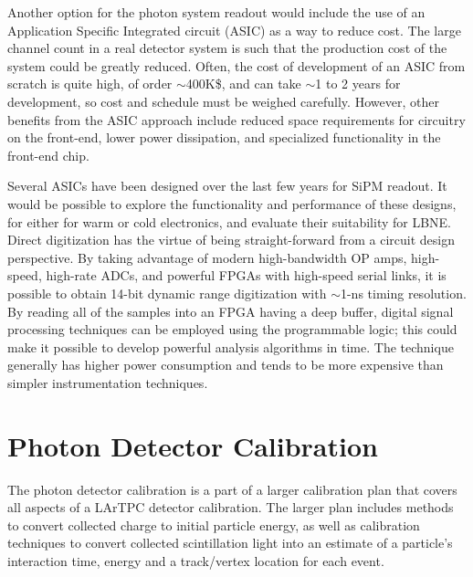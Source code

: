 Another option for the photon system readout would include the use 
of an Application Specific Integrated circuit (ASIC) as a way to
reduce cost.  The large channel count in a real detector system is
such that the production cost of the system could be greatly reduced. 
Often, the cost of development of an ASIC from scratch is quite high,
of order $\sim$400K\$, and can take $\sim$1 to 2 years for development, so cost
and schedule must be weighed carefully.  However, other benefits from
the ASIC approach include reduced space requirements for circuitry on
the front-end, lower power dissipation, and specialized functionality
in the front-end chip.  

Several ASICs have been
designed over the last few years %
for SiPM readout.  %
It would be possible to explore the functionality and performance of these
designs, for either for warm or cold electronics, and evaluate their suitability for LBNE.  %
Direct digitization has
the virtue of being straight-forward from a circuit design
perspective.  By taking advantage of modern high-bandwidth OP amps,
high-speed, high-rate ADCs, and powerful FPGAs with high-speed serial
links, it is possible to obtain 14-bit dynamic range digitization with
$\sim$1-ns timing resolution.  By reading all of the samples into an
FPGA having a deep buffer, digital signal processing techniques can be
employed using the programmable logic; this could make it possible
to develop powerful analysis
algorithms %
in time.  The technique generally has
higher power consumption and tends to be more expensive than simpler
instrumentation techniques.

\section{Photon Detector Calibration}
\label{sec_pd_calib}

The photon detector calibration is a part of a larger calibration plan
that covers all aspects of a LArTPC detector calibration. The larger plan
 includes
methods to convert collected charge to initial particle energy, as
well as calibration techniques to convert collected scintillation
light into an estimate of a particle's interaction time, energy and a
track/vertex location for each event.  

